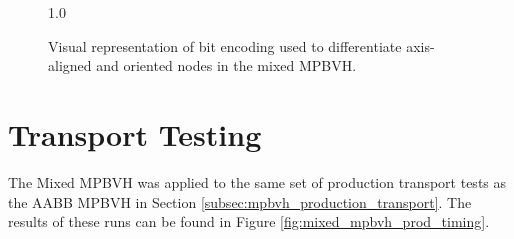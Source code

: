 \begin{figure}[H]
  \centering
  {1.0\textwidth}
  \caption{Visual representation of bit encoding used to differentiate
    axis-aligned and oriented nodes in the mixed MPBVH.}
  \label{fig:mixed_node_encoding}
\end{figure}

\section{Transport Testing}

The Mixed MPBVH was applied to the same set of production transport tests as the
AABB MPBVH in Section \ref{subsec:mpbvh_production_transport}. The results of
these runs can be found in Figure \ref{fig:mixed_mpbvh_prod_timing}.






